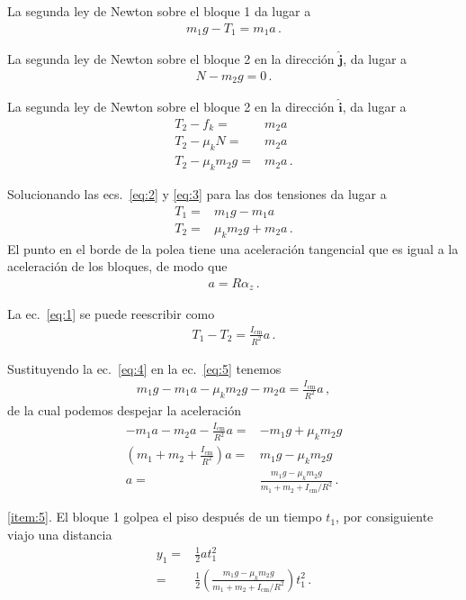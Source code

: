 \begin{itemize}
La segunda ley de Newton sobre el bloque 1 da lugar a
\begin{align}
  \label{eq:2}
  m_1g-T_1=m_1 a\,.
\end{align}

La segunda ley de Newton sobre el bloque 2 en la dirección $\hat{\mathbf{j}}$, da lugar a
\begin{align}
  N-m_2g=0\,.
\end{align}

La segunda ley de Newton sobre el bloque 2 en la dirección $\hat{\mathbf{i}}$, da lugar a
\begin{align}
  \label{eq:3}
  T_2-f_k=&m_2 a\nonumber\\
  T_2-\mu_k N=&m_2 a\nonumber\\
  T_2-\mu_k m_2 g=&m_2 a\,.
\end{align}

Solucionando las ecs.~\eqref{eq:2} y \eqref{eq:3} para las dos tensiones da lugar a
\begin{align}
  \label{eq:4}
  T_1=&m_1g -m_1 a\nonumber\\
  T_2=&\mu_k m_2 g+m_2 a\,.
\end{align}
El punto en el borde de la polea tiene una aceleración tangencial que es igual a la aceleración de los bloques, de modo que
\begin{align}
  a=R\alpha_z\,.
\end{align}

La ec.~\eqref{eq:1} se puede reescribir como
\begin{align}
  \label{eq:5}
  T_1-T_2=\frac{I_{\text{cm}}}{R^2}a\,.
\end{align}

Sustituyendo la ec.~\eqref{eq:4} en la ec.~\eqref{eq:5} tenemos
\begin{align}
  m_1g -m_1 a-\mu_k m_2 g-m_2 a=\frac{I_{\text{cm}}}{R^2}a\,,
\end{align}
de la cual podemos despejar la aceleración
\begin{align}
    -m_1 a-m_2 a-\frac{I_{\text{cm}}}{R^2}a=&-m_1g+\mu_k m_2 g\nonumber\\
    \left( m_1+m_2+\frac{I_{\text{cm}}}{R^2}\right)a=&m_1g-\mu_k m_2 g\nonumber\\
    a=&\frac{m_1g-\mu_k m_2 g}{m_1+m_2+I_{\text{cm}}/R^2}\,.
\end{align}

\ref{item:5}. El bloque 1 golpea el piso después de un tiempo $t_1$, por consiguiente viajo una distancia
\begin{align}
  y_1=&\frac{1}{2}a t_1^2\nonumber\\
  =&\frac{1}{2}
  \left(
    \frac{m_1g-\mu_k m_2 g}{m_1+m_2+I_{\text{cm}}/R^2}
  \right)t_1^2\,.
\end{align}
\end{itemize}

